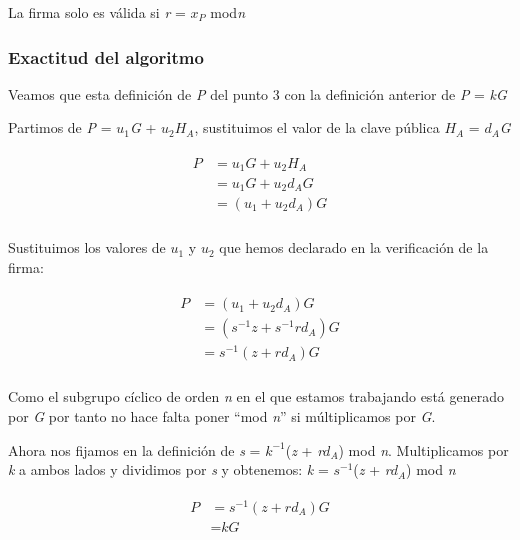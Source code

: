 \documentclass[11pt]{article}
\begin{document}
La firma solo es válida si \textit{r} = \textit{$x_P$} mod\textit{n}


\subsubsection*{Exactitud del algoritmo}
Veamos que esta definición de \textit{P} del punto 3 con la definición anterior de \textit{P} = \textit{kG}

Partimos de \textit{P} = \textit{$u_1$G} + \textit{$u_2$$H_A$}, sustituimos el valor de la clave pública \textit{$H_A$} = \textit{$d_A$G}


\begin{align}
\begin{split}
\textit{P} &= \textit{$u_1$G} + \textit{$u_2$$H_A$}\\ &= \textit{$u_1$G} + \textit{$u_2$$d_A$G}\\
&= (\textit{$u_1$} + \textit{$u_2$$d_A$})\textit{G}\\
\end{split}
\end{align}

Sustituimos los valores de $u_1$ y $u_2$ que hemos declarado en la verificación de la firma:

\begin{align}
\begin{split}
P &= (\textit{$u_1$} + \textit{$u_2$$d_A$})\textit{G}\\
&= (\textit{$s^{-1}$z} + \textit{$s^{-1}$r$d_A$}) \textit{G}\\
&= \textit{$s^{-1}$}(\textit{z} + \textit{r$d_A$}) \textit{G}\\
\end{split}
\end{align}

Como el subgrupo cíclico de orden \textit{n} en el que estamos trabajando está generado por \textit{G} por tanto no hace falta poner ``mod \textit{n}'' si múltiplicamos por \textit{G}.


Ahora nos fijamos en la definición de \textit{s} = \textit{$k^{-1}$}(\textit{z} + \textit{r$d_A$}) mod \textit{n}. Multiplicamos por \textit{k} a ambos lados y dividimos por \textit{s} y obtenemos: \textit{k} = \textit{$s^{-1}$}(\textit{z} + \textit{r$d_A$}) mod \textit{n}

\begin{align}
\begin{split}
P &= \textit{$s^{-1}$}(\textit{z} + \textit{r$d_A$}) \textit{G}\\
&= \textit{kG}
\end{split}
\end{align}
\end{document}
